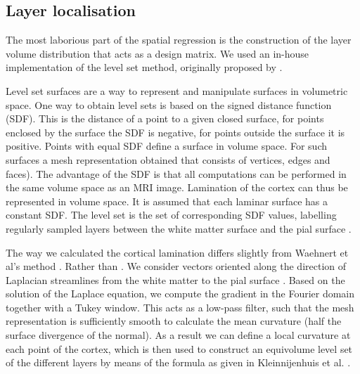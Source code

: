 \subsection{Layer localisation}
\label{subsec:LayerVolumeDist}
The most laborious part of the spatial regression is the construction of the layer volume distribution that acts as a design matrix. We used an in-house implementation of the level set method, originally proposed by \cite{Waehnert2014}.

Level set surfaces are a way to represent and manipulate surfaces in volumetric space. One way to obtain level sets is based on the signed distance function (SDF). This is the distance of a point to a given closed surface, for points enclosed by the surface the SDF is negative, for points outside the surface it is positive. Points with equal SDF define a surface in volume space. For such surfaces a mesh representation  obtained that consists of vertices, edges and faces\cite{Han2002}). The advantage of the SDF is that all computations can be performed in the same volume space as an MRI image. Lamination of the cortex can thus be represented in volume space. It is assumed that each laminar surface has a constant SDF. The level set is the set of corresponding SDF values, labelling regularly sampled layers between the white matter surface and the pial surface \cite{Waehnert2014}.

The way we calculated the cortical lamination differs slightly from Waehnert et al's method \cite{Waehnert2014}. Rather than . We consider vectors oriented along the direction of Laplacian streamlines from the white matter to the pial surface \cite{Leprince2015}. Based on the solution of the Laplace equation, we compute the gradient in the Fourier domain together with a Tukey window. This acts as a low-pass filter, such that the mesh representation is sufficiently smooth to calculate the mean curvature (half the surface divergence of the normal). As a result we can define a local curvature at each point of the cortex, which is then used to construct an equivolume level set of the different layers by means of the formula as given in Kleinnijenhuis et al. \cite{Kleinnijenhuis2015}.

